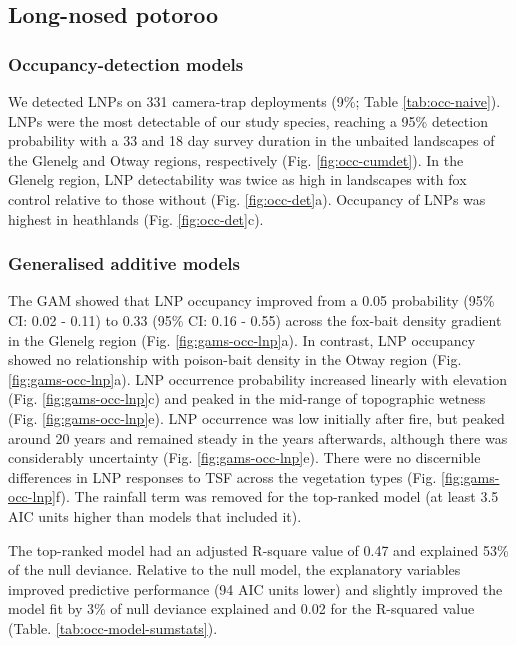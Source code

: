 \documentclass[11pt,a4paper,titlepage,twoside,openright]{style/unimelbthesis}
\begin{document}
\begin{mainmatter}
\hypertarget{long-nosed-potoroo-1}{%
\subsection{Long-nosed potoroo}\label{long-nosed-potoroo-1}}

\hypertarget{occupancy-detection-models-4}{%
\subsubsection{Occupancy-detection models}\label{occupancy-detection-models-4}}

We detected LNPs on 331 camera-trap deployments (9\%; Table \ref{tab:occ-naive}). LNPs were the most detectable of our study species, reaching a 95\% detection probability with a 33 and 18 day survey duration in the unbaited landscapes of the Glenelg and Otway regions, respectively (Fig. \ref{fig:occ-cumdet}). In the Glenelg region, LNP detectability was twice as high in landscapes with fox control relative to those without (Fig. \ref{fig:occ-det}a). Occupancy of LNPs was highest in heathlands (Fig. \ref{fig:occ-det}c).

\hypertarget{generalised-additive-models-4}{%
\subsubsection{Generalised additive models}\label{generalised-additive-models-4}}

The GAM showed that LNP occupancy improved from a 0.05 probability (95\% CI: 0.02 - 0.11) to 0.33 (95\% CI: 0.16 - 0.55) across the fox-bait density gradient in the Glenelg region (Fig. \ref{fig:gams-occ-lnp}a). In contrast, LNP occupancy showed no relationship with poison-bait density in the Otway region (Fig. \ref{fig:gams-occ-lnp}a). LNP occurrence probability increased linearly with elevation (Fig. \ref{fig:gams-occ-lnp}c) and peaked in the mid-range of topographic wetness (Fig. \ref{fig:gams-occ-lnp}e). LNP occurrence was low initially after fire, but peaked around 20 years and remained steady in the years afterwards, although there was considerably uncertainty (Fig. \ref{fig:gams-occ-lnp}e). There were no discernible differences in LNP responses to TSF across the vegetation types (Fig. \ref{fig:gams-occ-lnp}f). The rainfall term was removed for the top-ranked model (at least 3.5 AIC units higher than models that included it).

The top-ranked model had an adjusted R-square value of 0.47 and explained 53\% of the null deviance. Relative to the null model, the explanatory variables improved predictive performance (94 AIC units lower) and slightly improved the model fit by 3\% of null deviance explained and 0.02 for the R-squared value (Table. \ref{tab:occ-model-sumstats}).


\end{mainmatter}
\end{document}

